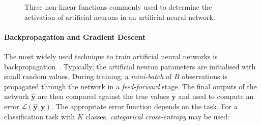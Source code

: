 \begin{figure}
	\centering
	\caption[Activation functions for artificial neural networks]{%
      Three non-linear functions commonly used to determine the activation of artificial neurons in an artificial neural network.%
	}%
	\label{fig:activation-functions}
\end{figure}

\paragraph*{Backpropagation and Gradient Descent}

The most widely used technique to train artificial neural networks is backpropagation~\cite{Rumelhart1986}. Typically, the artificial neuron parameters are initialised with small random values. During training, a \emph{mini-batch} of $B$ observations is propagated through the network in a \emph{feed-forward} stage. The final outputs of the network $\bm{\hat{y}}$ are then compared against the true values $\bm{y}$ and used to compute an error $\mathcal{L}(\bm{\hat{y}}, \bm{y})$. The appropriate error function depends on the task. For a classification task with $K$ classes, \emph{categorical cross-entropy} may be used:

